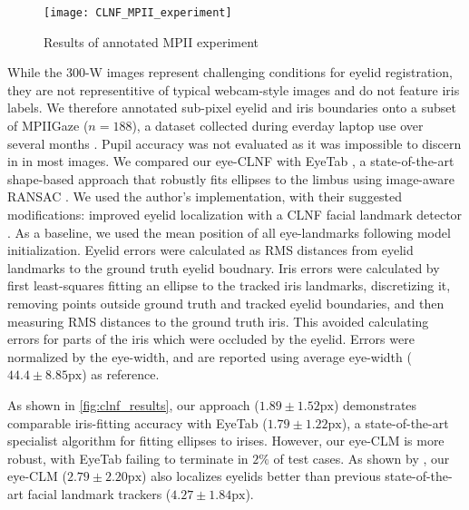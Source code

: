 \begin{figure}
    \centering
    \texttt{[image: CLNF\_MPII\_experiment]}
    \caption{Results of annotated MPII experiment}
    \label{fig:clnf_results}
\end{figure}



While the 300-W images represent challenging conditions for eyelid registration, they are not representitive of typical webcam-style images and do not feature iris labels.
We therefore annotated sub-pixel eyelid and iris boundaries onto a subset of MPIIGaze ($n\!=\!188$), a dataset collected during everday laptop use over several months \cite{zhang15_cvpr}.
Pupil accuracy was not evaluated as it was impossible to discern in in most images.
We compared our eye-CLNF with EyeTab \cite{wood2014eyetab}, a state-of-the-art shape-based approach that robustly fits ellipses to the limbus using image-aware RANSAC \cite{swirski2012robust}.
We used the author's implementation, with their suggested modifications: improved eyelid localization with a CLNF facial landmark detector \cite{baltrusaitis2013constrained}.
As a baseline, we used the mean position of all eye-landmarks following model initialization.
Eyelid errors were calculated as RMS distances from eyelid landmarks to the ground truth eyelid boudnary.
Iris errors were calculated by first least-squares fitting an ellipse to the tracked iris landmarks, discretizing it, removing points outside ground truth and tracked eyelid boundaries, and then measuring RMS distances to the ground truth iris.
This avoided calculating errors for parts of the iris which were occluded by the eyelid.
Errors were normalized by the eye-width, and are reported using average eye-width ($44.4\!\pm\!8.85\textrm{px}$) as reference.

As shown in \autoref{fig:clnf_results}, our approach ($1.89\!\pm\!1.52\textrm{px}$) demonstrates comparable iris-fitting accuracy with EyeTab ($1.79\!\pm\!1.22\textrm{px}$), a state-of-the-art specialist algorithm for fitting ellipses to irises. However, our eye-CLM is more robust, with EyeTab failing to terminate in $2\%$ of test cases. As shown by , our eye-CLM ($2.79\!\pm\!2.20\textrm{px}$) also localizes eyelids better than previous state-of-the-art facial landmark trackers ($4.27\!\pm\!1.84\textrm{px}$).


